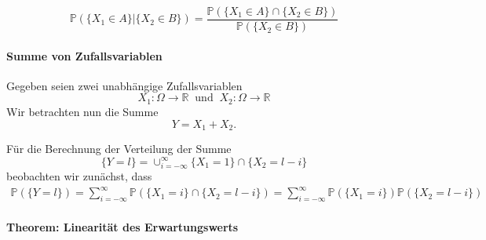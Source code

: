 \begin{equation*}
\mathbb{P} (\{X_{1} \in A \} | \{ X_{2} \in B \} ) = \frac {\mathbb{P} ( \{X_{1} \in A \} \cap \{X_{2} \in B \})} {\mathbb{P} (\{X_{2} \in B\})}
\end{equation*}



\paragraph {Summe von Zufallsvariablen}

Gegeben seien zwei unabhängige Zufallsvariablen
\begin{equation*}
X_{1}:\Omega \rightarrow \mathbb{R} \: \text{ und } \: X_{2}:\Omega \rightarrow \mathbb{R}
\end{equation*}
Wir betrachten nun die Summe
\begin{equation*}
Y=X_{1}+X_{2}
.\end{equation*}

F\"ur die Berechnung der Verteilung der Summe 
\begin{equation*}
\{Y=l\}=\cup_{i=-\infty}^{\infty} \{X_{1}=1\} \cap \{X_{2}=l-i\}
\end{equation*}
beobachten wir zun\"achst, dass 
\begin{align*}
\mathbb{P} (\{Y=l\}) = \sum_{i=-\infty}^{\infty} \mathbb{P} (\{X_{1}=i\} \cap \{X_{2}=l-i\}) = \sum_{i=-\infty}^{\infty} \mathbb{P} (\{X_{1} = i\})  \mathbb{P} (\{X_{2}=l-i\})
\end{align*}

\vspace{10pt}

\paragraph {Theorem: Linearit\"at des Erwartungswerts}

\vspace{5pt}

